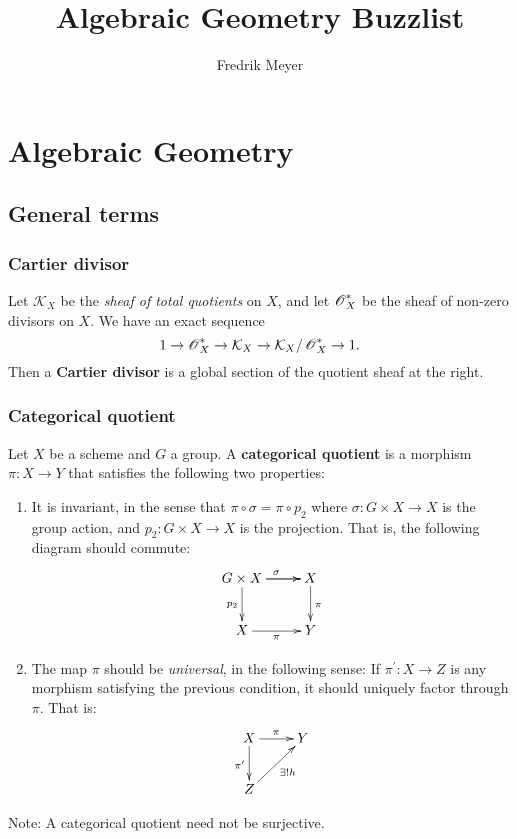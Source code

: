 \documentclass[11pt, english]{article}
\title{Algebraic Geometry Buzzlist}
\author{Fredrik Meyer}
\date{}
\begin{document}
\maketitle

\section{Algebraic Geometry}
\subsection{General terms}
\subsubsection{Cartier divisor}
\label{cartierdivisor}

Let $\mathcal K_X$ be the \emph{sheaf of total quotients} on $X$, and let $\operatorname{\mathscr{O}}_X^\ast$ be the sheaf of non-zero divisors on $X$. We have an exact sequence 
\[
1 \to \operatorname{\mathscr{O}}_X^\ast \to \mathcal K_X \to \mathcal K_X/\operatorname{\mathscr{O}}_X^\ast \to 1.
\]
Then a \textbf{Cartier divisor} is a global section of the quotient sheaf at the right.

\subsubsection{Categorical quotient}
\label{categoricalquotient}

Let $X$ be a scheme and $G$ a group. A \textbf{categorical quotient} is a morphism $\pi:X \to Y$ that satisfies the following two properties:
\begin{enumerate}
\item It is invariant, in the sense that $\pi \circ \sigma = \pi \circ p_2$ where $\sigma:G \times X \to X$ is the group action, and $p_2:G \times X \to X$ is the projection. That is, the following diagram should commute:
\[
\xymatrix{
G \times X \ar[r]^\sigma \ar[d]_{p_2} \ar[r] & X \ar[d]^{\pi} \\
X \ar[r]_{\pi} & Y
} 
\]
\item The map $\pi$ should be \emph{universal}, in the following sense: If $\pi^\prime:X \to Z$ is any morphism satisfying the previous condition, it should uniquely factor through $\pi$. That is:
\[
\xymatrix{
X \ar[d]_{\pi^\prime}\ar[r]^{\pi}  & Y \\
Z \ar[ur]_{\exists ! h}
}
\]
\end{enumerate}

Note: A categorical quotient need not be surjective.
\end{document}
